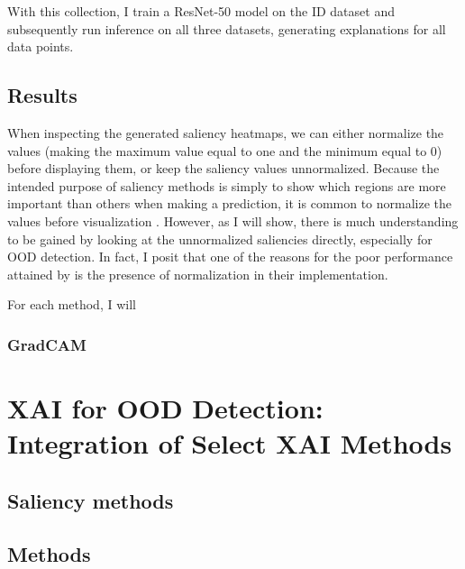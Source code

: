 \documentclass[UKenglish]{uiomasterthesis} %
\theoremstyle{definition}
\begin{document}
With this collection, I train a ResNet-50 model on the ID dataset and subsequently run inference on all three datasets, generating explanations for all data points.

\section{Results}

When inspecting the generated saliency heatmaps, we can either normalize the values (making the maximum value equal to one and the minimum equal to 0) before displaying them, or keep the saliency values unnormalized. Because the intended purpose of saliency methods is simply to show which regions are more important than others when making a prediction, it is common to normalize the values before visualization \cite{molnar, gradcam}. However, as I will show, there is much understanding to be gained by looking at the unnormalized saliencies directly, especially for OOD detection. In fact, I posit that one of the reasons for the poor performance attained by \cite{martinez} is the presence of normalization in their implementation.

For each method, I will 

\subsection{GradCAM}




\chapter{XAI for OOD Detection: Integration of Select XAI Methods}




\section{Saliency methods}



\section{Methods}






\backmatter{}
\printbibliography{}
\end{document}
